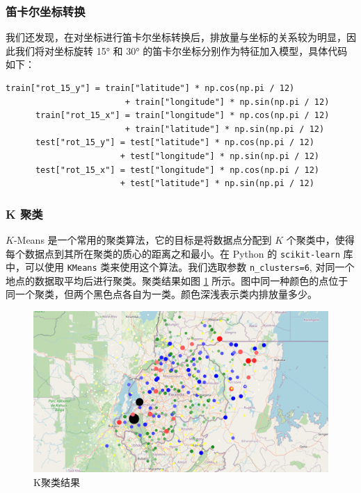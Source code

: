 \documentclass{ctexart}
\begin{document}
\begin{sloppypar}
\subsubsection{笛卡尔坐标转换}
我们还发现，在对坐标进行笛卡尔坐标转换后，排放量与坐标的关系较为明显，因此我们将对坐标旋转 15° 和 30° 的笛卡尔坐标分别作为特征加入模型，具体代码如下：

\begin{lstlisting}[style=Python]
      train["rot_15_y"] = train["latitude"] * np.cos(np.pi / 12) 
                        + train["longitude"] * np.sin(np.pi / 12)
      train["rot_15_x"] = train["longitude"] * np.cos(np.pi / 12) 
                        + train["latitude"] * np.sin(np.pi / 12)
      test["rot_15_y"] = test["latitude"] * np.cos(np.pi / 12) 
                       + test["longitude"] * np.sin(np.pi / 12)
      test["rot_15_x"] = test["longitude"] * np.cos(np.pi / 12) 
                       + test["latitude"] * np.sin(np.pi / 12)
\end{lstlisting}

\subsubsection{K 聚类}

$K$-Means 是一个常用的聚类算法，它的目标是将数据点分配到 $K$ 个聚类中，使得每个数据点到其所在聚类的质心的距离之和最小。在 Python 的 \texttt{scikit-learn} 库中，可以使用 \texttt{KMeans} 类来使用这个算法。我们选取参数 \texttt{n\_clusters=6}, 对同一个地点的数据取平均后进行聚类。聚类结果如图 \ref{fig:10} 所示。图中同一种颜色的点位于同一个聚类，但两个黑色点各自为一类。颜色深浅表示类内排放量多少。

\begin{figure}[H]
      \centering
      \includegraphics[width=1\textwidth]{output10.png}
      \caption{K聚类结果}
      \label{fig:10}
\end{figure}


\end{sloppypar}
\end{document}
